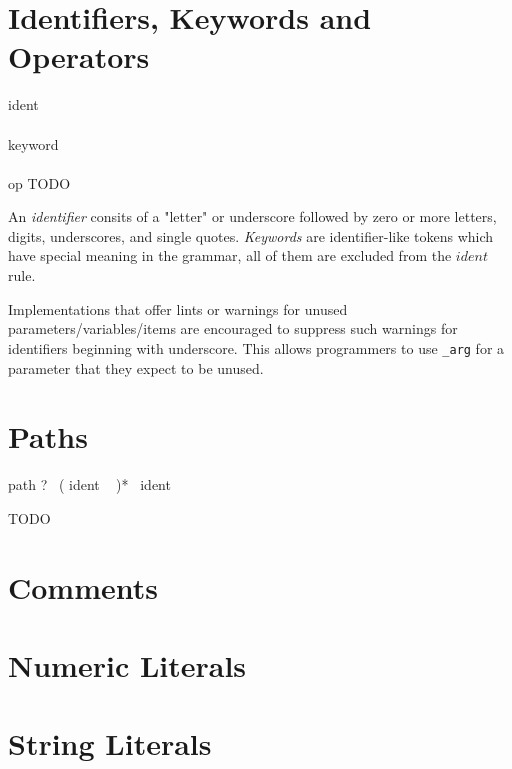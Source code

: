 \section{Identifiers, Keywords and Operators}

\begin{bnf}
  ident \eq {} \\
  \\
  keyword \eq
      \gor   {}
      \gor   {}
      \gor   {}
      \gor   {}
      \gor   {}
      \gorln {}
      \gor   {}
      \gor   {}
      \gor   {}
      \gor   {}
      \gor   {}
      \gor   {}
      \gor   {}
      \gorln {}
      \gor   {}
      \gor   {}
      \gor   {}
      \gor   {}
      \gor   {}
      \gor   {}
      \gor   {}
      \gorln {}
      \gor   {}
      \gor   {}
      \gor   \term{\_} \\
  \\
  op \eq TODO
\end{bnf}

An \emph{identifier} consits of a "letter" or underscore followed by zero or more letters, digits, underscores, and single quotes. \emph{Keywords} are identifier-like tokens which have special meaning in the grammar, all of them are excluded from the \(ident\) rule.

Implementations that offer lints or warnings for unused parameters/variables/items are encouraged to suppress such warnings for identifiers beginning with underscore. This allows programmers to use \texttt{\_arg} for a parameter that they expect to be unused.

\section{Paths}

\begin{bnf}
  path \eq \term{:}? \ ( ident \ \term{:} )* \ ident
\end{bnf}

TODO

\section{Comments}

\section{Numeric Literals}

\section{String Literals}
